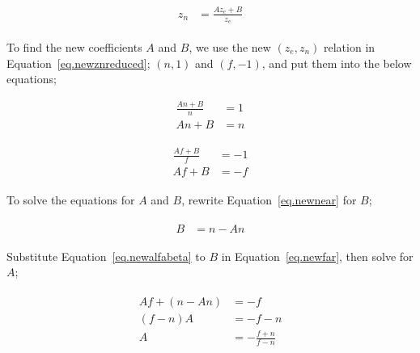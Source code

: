 \begin{equation}
\begin{aligned}
\begin{split}
    z_n &= \frac{Az_e+B}{z_e}
\end{split}    
\end{aligned}
\label{eq.newznreduced}
\end{equation}


To find the new coefficients $A$ and $B$, we use the new $(z_e, z_n)$ relation in Equation~\ref{eq.newznreduced}; $(n, 1)$ and $(f, -1)$, and put them into the below equations; 

\begin{equation}
\begin{aligned}
    \frac{An+B}{n} &= 1 \\
    An+B &= n
\end{aligned}
\label{eq.newnear}
\end{equation}

\begin{equation}
\begin{aligned}
\begin{split}
    \frac{Af+B}{f} &= -1\\
    Af+B &= -f
\end{split}    
\end{aligned}
\label{eq.newfar}
\end{equation}

To solve the equations for $A$ and $B$, rewrite Equation~\ref{eq.newnear} for $B$;

\begin{equation}
\begin{aligned}
\begin{split}
    B &= n-An
\end{split}    
\end{aligned}
\label{eq.newalfabeta}
\end{equation}


Substitute Equation~\ref{eq.newalfabeta} to $B$ in Equation~\ref{eq.newfar}, then solve for $A$; 

\begin{equation}
\begin{aligned}
\begin{split}
    Af+(n-An) & =-f\\
    (f-n)A &= -f-n\\
    A &= -\frac{f+n}{f-n}
\end{split}    
\end{aligned}
\label{eq.newalfa}
\end{equation}

